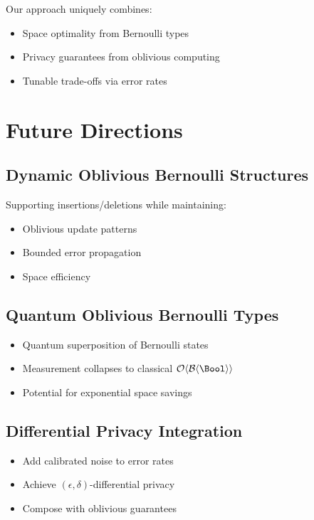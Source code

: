 \documentclass[11pt,final,hidelinks]{article}
\newcommand{\BernBool}{\mathcal{B}\langle \Bool \rangle}
\begin{document}
Our approach uniquely combines:
\begin{itemize}
    \item Space optimality from Bernoulli types
    \item Privacy guarantees from oblivious computing
    \item Tunable trade-offs via error rates
\end{itemize}

\section{Future Directions}

\subsection{Dynamic Oblivious Bernoulli Structures}

Supporting insertions/deletions while maintaining:
\begin{itemize}
    \item Oblivious update patterns
    \item Bounded error propagation
    \item Space efficiency
\end{itemize}

\subsection{Quantum Oblivious Bernoulli Types}

\begin{itemize}
    \item Quantum superposition of Bernoulli states
    \item Measurement collapses to classical $\Obv{\BernBool}$
    \item Potential for exponential space savings
\end{itemize}

\subsection{Differential Privacy Integration}

\begin{itemize}
    \item Add calibrated noise to error rates
    \item Achieve $(\epsilon, \delta)$-differential privacy
    \item Compose with oblivious guarantees
\end{itemize}
\end{document}
